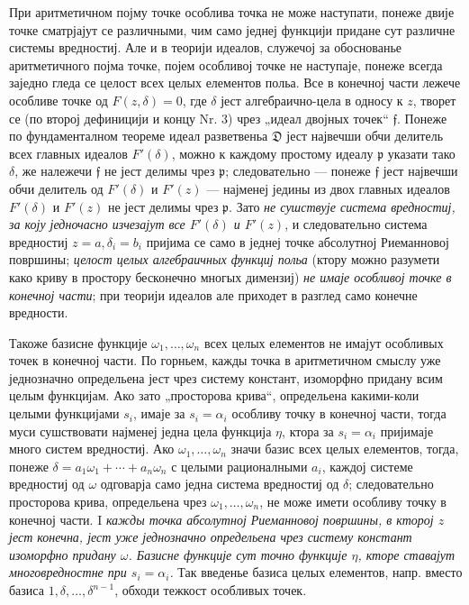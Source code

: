 ﻿\documentclass[11pt]{article}
\providecommand{\frD}{\mathfrak D}
\providecommand{\frf}{\mathfrak f}
\providecommand{\frp}{\mathfrak p}
\begin{document}
При аритметичном појму точке особлива точка не може наступати, понеже двије точке сматрјајут се различными, чим само једнеј функцији придане сут различне системы вредностиј. Але и в теорији идеалов, служечој за обоснованье аритметичного појма точке, појем особливој точке не наступаје, понеже всегда заједно гледа се целост всех целых елементов польа. Все в конечној части лежече особливе точке од \(F(z,\delta)=0\), где \(\delta\) јест алгебраично-цела в односу к \(z\), творет се (по второј дефиницији и концу Nr. 3) чрез „идеал двојных точек“ \(\frf\). Понеже по фундаменталном теореме идеал разветвеньа \(\frD\) јест највечши обчи делитель всех главных идеалов \(F'(\delta)\), можно к каждому простому идеалу \(\frp\) указати тако \(\delta\), же належечи \(\frf\) не јест делимы чрез \(\frp\); следовательно --- понеже \(\frf\) јест највечши обчи делитель од \(F'(\delta)\) и \(F'(z)\) --- најменеј једины из двох главных идеалов \(F'(\delta)\) и \(F'(z)\) не јест делимы чрез \(\frp\). Зато {\itshape не сушствује система вредностиј, за коју једночасно изчезајут все \(F'(\delta)\) и \(F'(z)\)}, и следовательно система вредностиј \(z=a,\delta_i=b_i\) пријима се само в једнеј точке абсолутној Риеманновој површины; {\itshape целост целых алгебраичных функциј польа} (ктору можно разумети како криву в простору бесконечно многых димензиј) {\itshape не имаје особливој точке в конечној части}; при теорији идеалов але приходет в разглед само конечне вредности.

Такоже базисне функције \(\omega_1,\ldots,\omega_n\) всех целых елементов не имајут особливых точек в конечној части. По горньем, кажды точка в аритметичном смыслу уже једнозначно определьена јест чрез систему констант, изоморфно придану всим целым функцијам. Ако зато „просторова крива“, определьена какими-коли целыми функцијами \(s_i\), имаје за \(s_i=\alpha_i\) особливу точку в конечној части, тогда муси сушствовати најменеј једна цела функција \(\eta\), ктора за \(s_i=\alpha_i\) пријимаје много систем вредностиј. Ако \(\omega_1,\ldots,\omega_n\) значи базис всех целых елементов, тогда, понеже \(\delta=a_1\omega_1+\cdots+a_n\omega_n\) с целыми рационалными \(a_i\), каждој системе вредностиј од \(\omega\) одговарја само једна система вредностиј од \(\delta\); следовательно просторова крива, определьена чрез \(\omega_1,\ldots,\omega_n\), не може имети особливу точку в конечној части. I {\itshape кажды точка абсолутној Риеманновој површины, в кторој \(z\) јест конечна, јест уже једнозначно определьена чрез систему констант изоморфно придану \(\omega\). Базисне функције сут точно функције \(\eta\), кторе ставајут многовредностне при \(s_i=\alpha_i\).} Так введенье базиса целых елементов, напр. вместо базиса \(1,\delta,\ldots,\delta^{n-1}\), обходи тежкост особливых точек.
\end{document}
